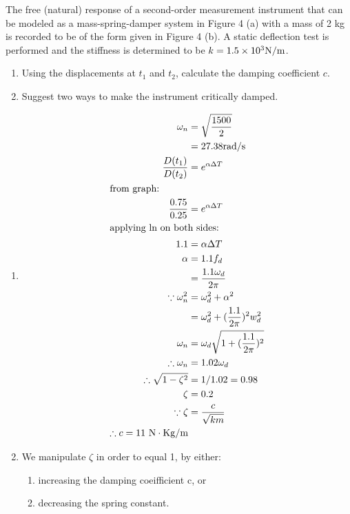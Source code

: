 \documentclass[a4paper,11pt,dvipsnames]{book}
\begin{document}
\begin{question}
The free (natural) response of a second-order measurement instrument that can be modeled as a mass-spring-damper system in Figure 4 (a) with a mass of 2 kg is recorded to be of the form given in Figure 4 (b). A static deflection test is performed and the stiffness is determined to be $k = 1.5 \times 10^3 {\rm N/m}$.
\begin{enumerate}
\item Using the displacements at $t_1$ and $t_2$, calculate the damping coefficient $c$.
\item  Suggest two ways to make the instrument critically damped.
\end{enumerate} 

\end{question}
\begin{solution}
\begin{enumerate}
\item 
\begin{align*}
\omega_n &= \sqrt{\frac{1500}{2}} \\
&= 27.38 {\rm rad/s} \\
\frac{D(t_1)}{D(t_2)} &= e^{\alpha \Delta T} \\ 
\intertext{from graph:}
\frac{0.75}{0.25} &= e^{\alpha \Delta T} \\
\intertext{applying ln on both sides:}
1.1 &= \alpha \Delta T \\ 
\alpha &= 1.1 f_d \\
&= \frac{1.1\omega_d}{2\pi} \\
\because \omega_n^2 &= \omega_d^2 + \alpha^2 \\
&= \omega_d^2 + (\frac{1.1}{2\pi})^2w_d^2 \\
\omega_n &= \omega_d \sqrt{ 1 + (\frac{1.1}{2\pi})^2 } \\
\therefore \omega_n &= 1.02 \omega_d \\
\therefore \sqrt{1-\zeta^2} &= 1/1.02 = 0.98  \\
\zeta &= 0.2 \\
\because \zeta &= \frac{c}{\sqrt{km}} \\
\therefore c = 11 ~{\rm N \cdot Kg / m}
\end{align*}
\item  We manipulate $\zeta$ in order to equal 1, by either:
\begin{enumerate}
\item increasing the damping coeifficient c, or
\item decreasing the spring constant.
\end{enumerate}
\end{enumerate} 
\end{solution}
\end{document}
